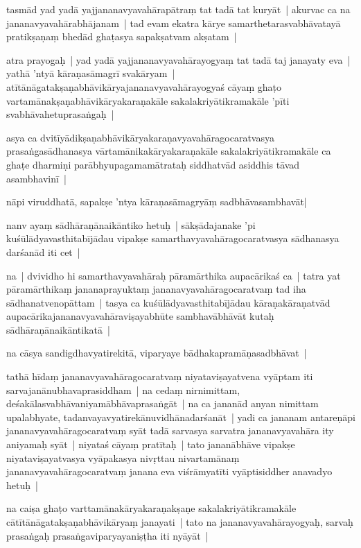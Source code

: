 \documentclass[article,a4paper]{memoir}
\begin{document}
	  \pstart tasmā\-d yad yadā\- yajjananavyavahā\-rapā\-traṃ tat tadā\- tat kuryā\-t | akurvac ca na jananavyavahā\-rabhā\-janam | tad evam ekatra kā\-rye samarthetarasvabhā\-vatayā\- pratikṣaṇaṃ bhedā\-d ghaṭasya sapakṣatvam akṣatam |
	\pend
      

	  \pstart atra prayogaḥ | yad yadā\- yajjananavyavahā\-rayogyaṃ tat tadā\- taj janayaty eva | yathā\- 'ntyā\- kā\-raṇasā\-magrī\- svakā\-ryam | atī\-tā\-nā\-gatakṣaṇabhā\-vikā\-ryajananavyavahā\-rayogyaś cā\-yaṃ ghaṭo vartamā\-nakṣaṇabhā\-vikā\-ryakaraṇakā\-le sakalakriyā\-tikramakā\-le 'pī\-ti svabhā\-vahetuprasaṅgaḥ |
	\pend
      

	  \pstart asya ca dvitī\-yā\-dikṣaṇabhā\-vikā\-ryakaraṇavyavahā\-ragocaratvasya prasaṅgasā\-dhanasya vā\-rtamā\-nikakā\-ryakaraṇakā\-le sakalakriyā\-tikramakā\-le ca ghaṭe dharmiṇi parā\-bhyupagamamā\-trataḥ siddhatvā\-d asiddhis tā\-vad asambhavinī\- |
	\pend
      

	  \pstart nā\-pi viruddhatā\-, sapakṣe 'ntya kā\-raṇasā\-magryā\-ṃ sadbhā\-vasambhavā\-t| 
	\pend
      

	  \pstart nanv ayaṃ sā\-dhā\-raṇā\-naikā\-ntiko hetuḥ | sā\-kṣā\-dajanake 'pi kuśū\-lā\-dyavasthitabī\-jā\-dau vipakṣe samarthavyavahā\-ragocaratvasya sā\-dhanasya darśanā\-d iti cet | 
	\pend
      

	  \pstart na | dvividho hi samarthavyavahā\-raḥ pā\-ramā\-rthika aupacā\-rikaś ca | tatra yat pā\-ramā\-rthikaṃ jananaprayuktaṃ jananavyavahā\-ragocaratvaṃ tad iha sā\-dhanatvenopā\-ttam | tasya ca kuśū\-lā\-dyavasthitabī\-jā\-dau kā\-raṇakā\-raṇatvā\-d aupacā\-rikajananavyavahā\-raviṣayabhū\-te sambhavā\-bhā\-vā\-t kutaḥ sā\-dhā\-raṇā\-naikā\-ntikatā\- | 
	\pend
      

	  \pstart na cā\-sya sandigdhavyatirekitā\-, viparyaye bā\-dhakapramā\-ṇasadbhā\-vat | 
	\pend
      

	  \pstart tathā\- hī\-daṃ jananavyavahā\-ragocaratvaṃ niyataviṣayatvena vyā\-ptam iti sarvajanā\-nubhavaprasiddham | na cedaṃ nirnimittam, deśakā\-lasvabhā\-vaniyamā\-bhā\-vaprasaṅgā\-t | na ca jananā\-d anyan nimittam upalabhyate, tadanvayavyatirekā\-nuvidhā\-nadarśanā\-t | yadi ca jananam antareṇā\-pi jananavyavahā\-ragocaratvaṃ syā\-t tadā\- sarvasya sarvatra jananavyavahā\-ra ity aniyamaḥ syā\-t | niyataś cā\-yaṃ pratī\-taḥ | tato jananā\-bhā\-ve vipakṣe niyataviṣayatvasya vyā\-pakasya nivṛttau nivartamā\-naṃ jananavyavahā\-ragocaratvaṃ janana eva viśrā\-myatī\-ti vyā\-ptisiddher anavadyo hetuḥ |
	\pend
      

	  \pstart na caiṣa ghaṭo varttamā\-nakā\-ryakaraṇakṣaṇe sakalakriyā\-tikramakā\-le cā\-tī\-tā\-nā\-gatakṣaṇabhā\-vikā\-ryaṃ janayati | tato na jananavyavahā\-rayogyaḥ, sarvaḥ prasaṅgaḥ prasaṅgaviparyayaniṣṭha iti nyā\-yā\-t |
	\pend
      
\end{document}
